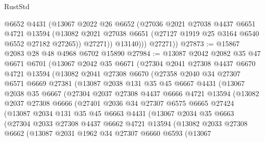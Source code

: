\begin{lexlean}{RustStd}
\begin{coremodule}
              @6652
              @4431
              (@13067
                @2022
                @26
                @6652
                (@27036
                  @2021
                  @27038
                  @4437
                  @6651
                  @4721
                  @13594
                  (@13082 @2021 @27038 @6651 (@27127 @1919 @25 @3164 @6540 @6552 @27182 @27265))
                  @27271))
              @13140)))
        @27271))
@27873 := @15867 @2083 @28 @48 @4968 @6702 @15890
@27984 := @13087
    @2042
    @2082
    @35
    @47
    @6671
    @6701
    (@13067
      @2042
      @35
      @6671
      (@27304
        @2041
        @27308
        @4437
        @6670
        @4721
        @13594
        (@13082
          @2041
          @27308
          @6670
          (@27358
            @2040
            @34
            @27307
            @6571
            @6669
            @27381
            (@13087
              @2038
              @131
              @35
              @45
              @6667
              @4431
              (@13067
                @2038
                @35
                @6667
                (@27304
                  @2037
                  @27308
                  @4437
                  @6666
                  @4721
                  @13594
                  (@13082
                    @2037
                    @27308
                    @6666
                    (@27401
                      @2036
                      @34
                      @27307
                      @6575
                      @6665
                      @27424
                      (@13087
                        @2034
                        @131
                        @35
                        @45
                        @6663
                        @4431
                        (@13067
                          @2034
                          @35
                          @6663
                          (@27304
                            @2033
                            @27308
                            @4437
                            @6662
                            @4721
                            @13594
                            (@13082
                              @2033
                              @27308
                              @6662
                              (@13087
                                @2031
                                @1962
                                @34
                                @27307
                                @6660
                                @6593
                                (@13067

\end{coremodule}
\end{lexlean}
